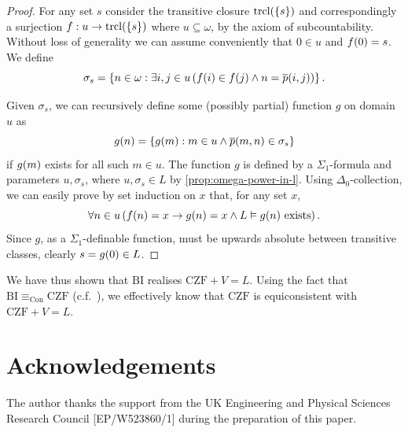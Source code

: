 \documentclass[preprint]{elsarticle}
\theoremstyle{plain}
\DeclareMathOperator{\trcl}{trcl}
\begin{document}
\begin{proof}
  For any set $s$ consider the transitive closure $\trcl\mleft(\left\{s\right\}\mright)$ and correspondingly a surjection $f : u \rightarrow \trcl\mleft(\left\{s\right\}\mright)$ where $u \subseteq \omega$, by the axiom of subcountability. Without loss of generality we can assume conveniently that $0 \in u$ and $f\mleft(0\mright) = s$. We define
  \[\sigma_s = \left\{n \in \omega : \exists i, j \in u \left(f\mleft(i\mright) \in f\mleft(j\mright) \land n = \overline{p}\mleft(i, j\mright)\right)\right\}.\]

  Given $\sigma_s$, we can recursively define some (possibly partial) function $g$ on domain $u$ as
  \[g\mleft(n\mright) = \left\{g\mleft(m\mright) : m \in u \land \overline{p}\mleft(m, n\mright) \in \sigma_s\right\}\]
  if $g\mleft(m\mright)$ exists for all such $m \in u$. The function $g$ is defined by a $\Sigma_1$-formula and parameters $u, \sigma_s$, where $u, \sigma_s \in L$ by \autoref{prop:omega-power-in-l}. Using $\Delta_0$-collection, we can easily prove by set induction on $x$ that, for any set $x$,
  \[\forall n \in u \left(f\mleft(n\mright) = x \rightarrow g\mleft(n\mright) = x \land L \vDash \text{$g\mleft(n\mright)$ exists}\right).\]
  Since $g$, as a $\Sigma_1$-definable function, must be upwards absolute between transitive classes, clearly $s = g\mleft(0\mright) \in L$.
\end{proof}

We have thus shown that $\mathrm{BI}$ realises $\mathrm{CZF} + V = L$. Using the fact that $\mathrm{BI} \equiv_{\mathrm{Con}} \mathrm{CZF}$ (c.f.\ \cite[Theorem 2.2]{rathjen14-czf-lpo}), we effectively know that $\mathrm{CZF}$ is equiconsistent with $\mathrm{CZF} + V = L$.

\section*{Acknowledgements}

The author thanks the support from the UK Engineering and Physical Sciences Research Council [EP/W523860/1] during the preparation of this paper.



\end{document}
